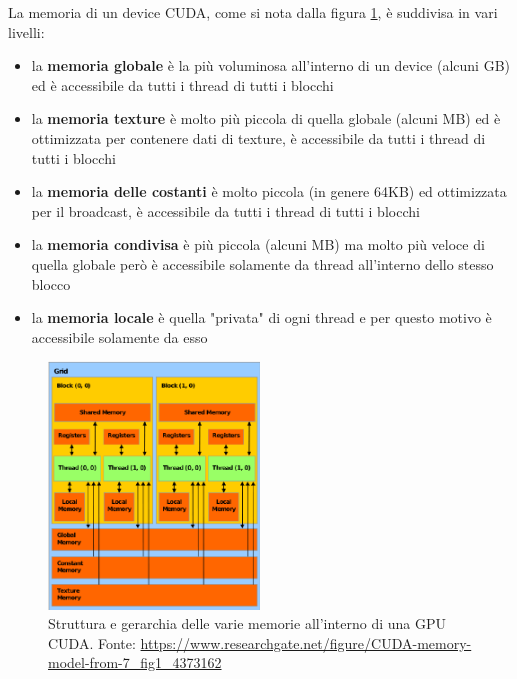 \documentclass[12pt,a4paper,oneside]{book}
\begin{document}
	La memoria di un device CUDA, come si nota dalla figura \ref{fig:cuda-memory-model}, è suddivisa in vari livelli:
	\begin{itemize}
		\item la \textbf{memoria globale} è la più voluminosa all'interno di un device (alcuni GB) ed è accessibile da tutti i thread di tutti i blocchi
		\item la \textbf{memoria texture} è molto più piccola di quella globale (alcuni MB) ed è ottimizzata per contenere dati di texture, è accessibile da tutti i thread di tutti i blocchi
		\item la \textbf{memoria delle costanti} è molto piccola (in genere 64KB) ed ottimizzata per il broadcast, è accessibile da tutti i thread di tutti i blocchi
		\item la \textbf{memoria condivisa} è più piccola (alcuni MB) ma molto più veloce di quella globale però è accessibile solamente da thread all'interno dello stesso blocco
		\item la \textbf{memoria locale} è quella "privata" di ogni thread e per questo motivo è accessibile solamente da esso
	\end{itemize}
	
	\begin{figure}[!ht]
		\centering
		\includegraphics[width=0.5\textwidth]{CUDA-memory-model}
		\caption[Struttura della memoria di una GPU CUDA]{Struttura e gerarchia delle varie memorie all'interno di una GPU CUDA. Fonte: \url{https://www.researchgate.net/figure/CUDA-memory-model-from-7\_fig1\_4373162}}
		\label{fig:cuda-memory-model}
	\end{figure}
\end{document}
